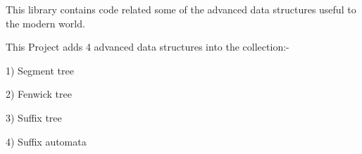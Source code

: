 This library contains code related some of the advanced data structures useful to the modern world.

This Project adds 4 advanced data structures into the collection\+:-\/

1) Segment tree

2) Fenwick tree

3) Suffix tree

4) Suffix automata 